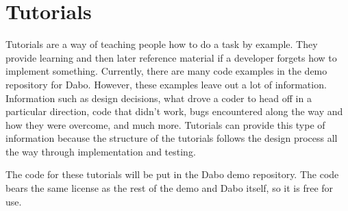 
\newpage
\part{Tutorials}

Tutorials are a way of teaching people how to do a task by example.  They provide learning and then later reference material if a developer forgets how to implement something.  Currently, there are many code examples in the demo repository for Dabo.  However, these examples leave out a lot of information.  Information such as design decisions, what drove a coder to head off in a particular direction, code that didn't work, bugs encountered along the way and how they were overcome, and much more.  Tutorials can provide this type of information because the structure of the tutorials follows the design process all the way through implementation and testing.

The code for these tutorials will be put in the Dabo demo repository.  The code bears the same license as the rest of the demo and Dabo itself, so it is free for use.

\newpage


